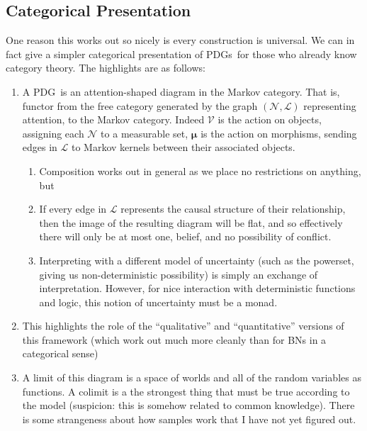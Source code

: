 \documentclass{article}
\newcommand{\MN}{PDG}%
\newcommand{\MNs}{PDGs}
\newcommand\bmu{\boldsymbol{\mu}}
\begin{document}
	\begin{vcat}
		\section{Categorical Presentation}
		One reason this works out so nicely is every construction is universal. We can in fact give a simpler categorical presentation of \MNs\ for those who already know category theory. The highlights are as follows:
		\begin{enumerate}
			\item A \MN\ is an attention-shaped diagram in the Markov category. That is, functor from the free category generated by the graph $(\mathcal N, \mathcal L)$ representing attention, to the Markov category. Indeed $\mathcal V$ is the action on objects, assigning each $\mathcal N$ to a measurable set, $\bmu$ is the action on morphisms, sending edges in $\mathcal L$ to Markov kernels between their associated objects. 
			\begin{enumerate}
				\item Composition works out in general as we place no restrictions on anything, but
				\item If every edge in $\mathcal L$ represents the causal structure of their relationship, then the image of the resulting diagram will be flat, and so effectively there will only be at most one, belief, and no possibility of conflict.
				\item Interpreting with a different model of uncertainty (such as the powerset, giving us non-deterministic possibility) is simply an exchange of interpretation. However, for nice interaction with deterministic functions and logic, this notion of uncertainty must be a monad.
			\end{enumerate}
			
			\item This highlights the role of the ``qualitative'' and ``quantitative'' versions of this framework (which work out much more cleanly than for BNs in a categorical sense)
			
			\item A limit of this diagram is a space of worlds and all of the random variables as functions. A colimit is a the strongest thing that must be true according to the model (suspicion: this is somehow related to common knowledge). There is some strangeness about how samples work that I have not yet figured out.
		\end{enumerate}



\end{vcat}
\end{document}
